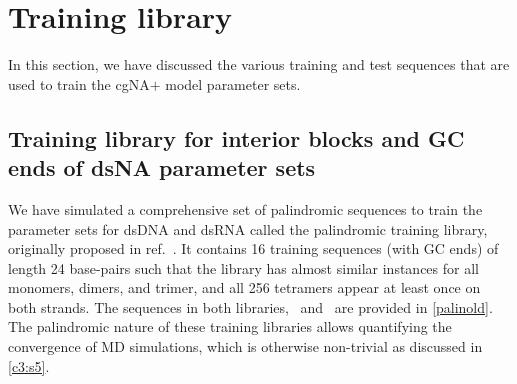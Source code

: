 \section{Training library}\label{c3:s3}
In this section, we have discussed the various training and test sequences that are used to train the cgNA$+$ model parameter sets.
\subsection{Training library for interior blocks and GC ends of dsNA parameter sets}
We have simulated a comprehensive set of palindromic sequences to train the parameter sets for dsDNA and dsRNA called the palindromic training library, originally proposed in ref.~\cite{patelithesis}.
It contains 16 training sequences (with GC ends) of length 24 base-pairs such that the library has almost similar instances for all monomers, dimers, and trimer, and all 256 tetramers appear at least once on both strands.
The sequences in both libraries, \Lbdna \ and \Lbrna \ are provided in \cref{palinold}.
The palindromic nature of these training libraries allows quantifying the convergence of MD simulations, which is otherwise non-trivial as discussed in \cref{c3:s5}. \hfill \clearpage

